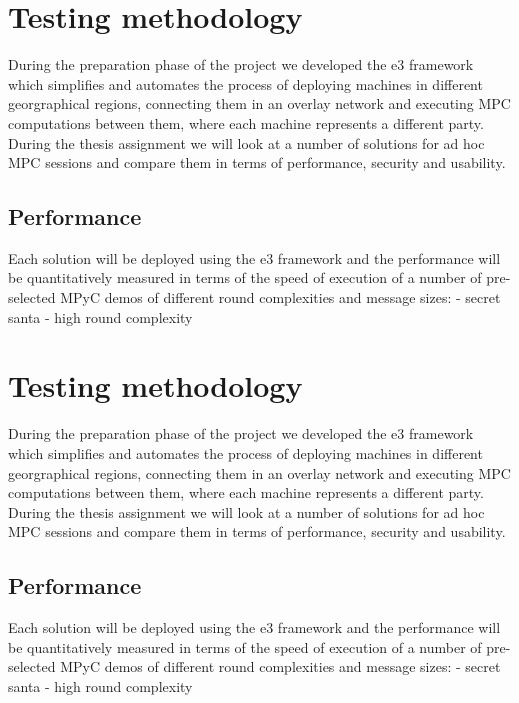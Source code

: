 \hypertarget{testing-methodology}{%
\chapter{Testing methodology}\label{testing-methodology}}

During the preparation phase of the project we developed the \gls{e3}
framework which simplifies and automates the process of deploying
machines in different georgraphical regions, connecting them in an
overlay network and executing MPC computations between them, where each
machine represents a different party. During the thesis assignment we
will look at a number of solutions for ad hoc MPC sessions and compare
them in terms of performance, security and usability.

\hypertarget{performance}{%
\section{Performance}\label{performance}}

Each solution will be deployed using the \gls{e3} framework and the
performance will be quantitatively measured in terms of the speed of
execution of a number of pre-selected MPyC demos of different round
complexities and message sizes: - secret santa - high round complexity

\hypertarget{testing-methodology-1}{%
\chapter{Testing methodology}\label{testing-methodology-1}}

During the preparation phase of the project we developed the \gls{e3}
framework which simplifies and automates the process of deploying
machines in different georgraphical regions, connecting them in an
overlay network and executing MPC computations between them, where each
machine represents a different party. During the thesis assignment we
will look at a number of solutions for ad hoc MPC sessions and compare
them in terms of performance, security and usability.

\hypertarget{performance-1}{%
\section{Performance}\label{performance-1}}

Each solution will be deployed using the \gls{e3} framework and the
performance will be quantitatively measured in terms of the speed of
execution of a number of pre-selected MPyC demos of different round
complexities and message sizes: - secret santa - high round complexity
